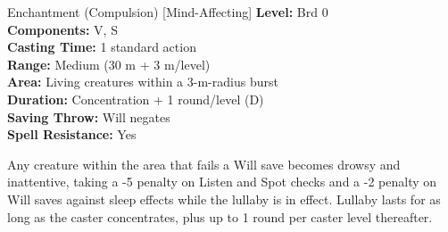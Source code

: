 {Enchantment (Compulsion) [Mind-Affecting]}
{
	\textbf{Level:}
	Brd 0\\
	\textbf{Components:}
	V, S\\
	\textbf{Casting Time:}
	1 standard action\\
	\textbf{Range:}
	Medium (30 m + 3 m/level)\\
	\textbf{Area:}
	Living creatures within a 3-m-radius burst\\
	\textbf{Duration:}
	Concentration + 1 round/level (D)\\
	\textbf{Saving Throw:}
	Will negates\\
	\textbf{Spell Resistance:}
	Yes\\
}
{
	Any creature within the area that fails a Will save becomes drowsy and inattentive, taking a -5 penalty on Listen and Spot checks and a -2 penalty on Will saves against sleep effects while the lullaby is in effect. Lullaby lasts for as long as the caster concentrates, plus up to 1 round per caster level thereafter.

}
